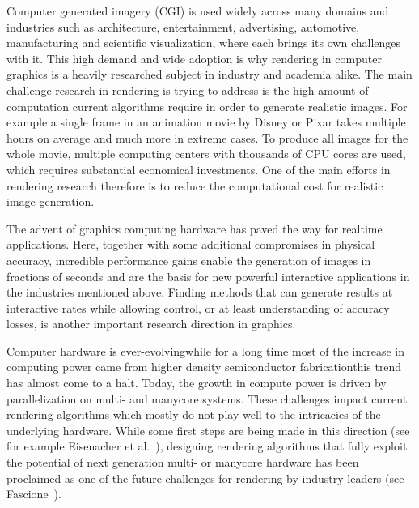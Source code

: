 Computer generated imagery (CGI) is used widely across many domains and industries such as architecture, entertainment, advertising, automotive, manufacturing and scientific visualization, where each brings its own challenges with it. This high demand and wide adoption is why rendering in computer graphics is a heavily researched subject in industry and academia alike. The main challenge research in rendering is trying to address is the high amount of computation current algorithms require in order to generate realistic images. For example a single frame in an animation movie by Disney or Pixar takes multiple hours on average and much more in extreme cases. To produce all images for the whole movie, multiple computing centers with thousands of CPU cores are used, which requires substantial economical investments. One of the main efforts in rendering research therefore is to reduce the computational cost for realistic image generation.

The advent of graphics computing hardware has paved the way for realtime applications. Here, together with some additional compromises in physical accuracy, incredible performance gains enable the generation of images in fractions of seconds and are the basis for new powerful interactive applications in the industries mentioned above. Finding methods that can generate results at interactive rates while allowing control, or at least understanding of accuracy losses, is another important research direction in graphics.

Computer hardware is ever-evolving\mydash while for a long time most of the increase in computing power came from higher density semiconductor fabrication\mydash this trend has almost come to a halt. Today, the growth in compute power is driven by parallelization on multi- and manycore systems. These challenges impact current rendering algorithms which mostly do not play well to the intricacies of the underlying hardware. While some first steps are being made in this direction (see for example Eisenacher et al.~\cite{Eisenacher13}), designing rendering algorithms that fully exploit the potential of next generation multi- or manycore hardware has been proclaimed as one of the future challenges for rendering by industry leaders (see Fascione~\cite{Fascione15}).

